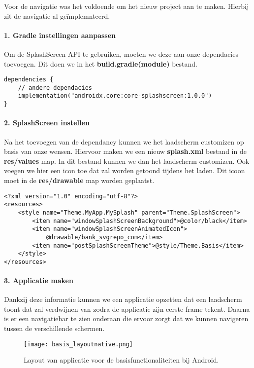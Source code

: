 Voor de navigatie was het voldoende om het nieuw project aan te maken. 
Hierbij zit de navigatie al geïmplemnteerd.

\paragraph{1. Gradle instellingen aanpassen}
Om de SplashScreen API te gebruiken, moeten we deze aan onze dependacies toevoegen. Dit doen we in
het \textbf{build.gradle(module)} bestand.
\begin{verbatim}
dependencies {
    // andere dependacies
    implementation("androidx.core:core-splashscreen:1.0.0")
}
\end{verbatim}

\paragraph{2. SplashScreen instellen}
Na het toevoegen van de dependancy kunnen we het laadscherm customizen op basis van onze wensen. 
Hiervoor maken we een nieuw \textbf{splash.xml} bestand in de \textbf{res/values} map. In dit 
bestand kunnen we dan het laadscherm customizen. Ook voegen we hier een icon toe dat zal worden
getoond tijdens het laden. Dit icoon moet in de \textbf{res/drawable} map worden geplaatst.
\begin{verbatim}
<?xml version="1.0" encoding="utf-8"?>
<resources>
    <style name="Theme.MyApp.MySplash" parent="Theme.SplashScreen">
        <item name="windowSplashScreenBackground">@color/black</item>
        <item name="windowSplashScreenAnimatedIcon">
            @drawable/bank_svgrepo_com</item>
        <item name="postSplashScreenTheme">@style/Theme.Basis</item>
    </style>
</resources>
\end{verbatim}

\paragraph{3. Applicatie maken}
Dankzij deze informatie kunnen we een applicatie opzetten dat een laadscherm toont dat zal verdwijnen 
van zodra de applicatie zijn eerste frame tekent. Daarna is er een navigatiebar te zien onderaan die ervoor zorgt dat 
we kunnen navigeren tussen de verschillende schermen.
\begin{figure}[H]
    \centering
    \texttt{[image: basis\_layoutnative.png]}
    \caption{Layout van applicatie voor de basisfunctionaliteiten bij Android.}
\end{figure}
